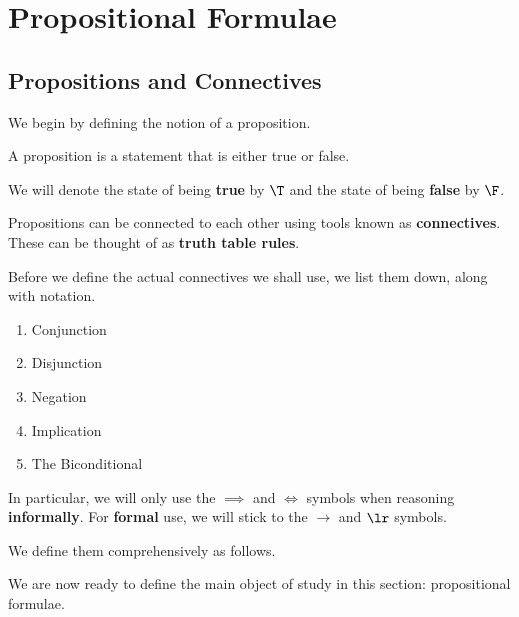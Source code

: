 \section{Propositional Formulae}

\subsection{Propositions and Connectives}

We begin by defining the notion of a proposition.

\begin{boxdefinition}[Proposition]
    A proposition is a statement that is either true or false.
\end{boxdefinition}

\begin{boxconvention}
    We will denote the state of being \textbf{true} by $\T$ and the state of being \textbf{false} by $\F$.
\end{boxconvention}

Propositions can be connected to each other using tools known as \textbf{connectives}. These can be thought of as \textbf{truth table rules}.

\begin{boxconvention}
    Before we define the actual connectives we shall use, we list them down, along with notation.
    \begin{enumerate}[noitemsep]
        \item Conjunction
        \item Disjunction
        \item Negation
        \item Implication
        \item The Biconditional
    \end{enumerate}
    In particular, we will only use the $\implies$ and $\iff$ symbols when reasoning \textbf{informally}. For \textbf{formal} use, we will stick to the $\to$ and $\lr$ symbols.
\end{boxconvention}

We define them comprehensively as follows.
\begin{boxdefinition}[Connectives]\label{Ch1:Def:Connective}
    \sorry %
\end{boxdefinition}

We are now ready to define the main object of study in this section: propositional formulae.

